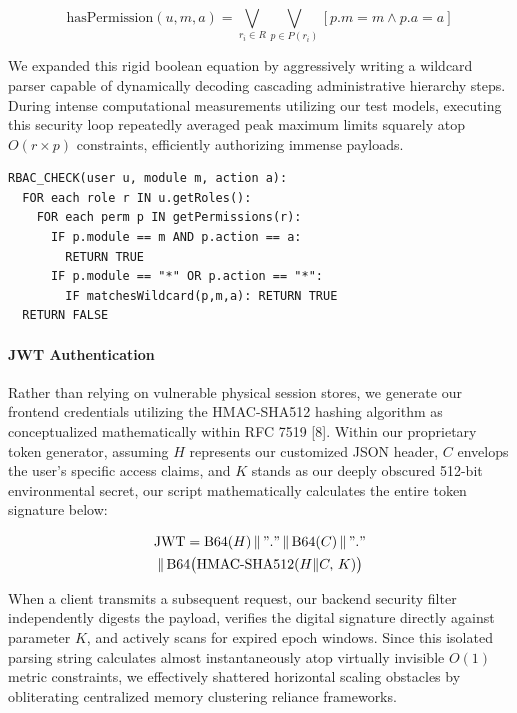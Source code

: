 \begin{equation}
\text{hasPermission}(u, m, a) = \bigvee_{r_i \in R} \bigvee_{p \in P(r_i)} \left[p.m = m \wedge p.a = a\right]
\end{equation}

We expanded this rigid boolean equation by aggressively writing a
wildcard parser capable of dynamically decoding cascading administrative
hierarchy steps. During intense computational measurements utilizing our
test models, executing this security loop repeatedly averaged peak
maximum limits squarely atop \(O(r \times p)\) constraints, efficiently
authorizing immense payloads.

\begin{footnotesize}
\begin{verbatim}
RBAC_CHECK(user u, module m, action a):
  FOR each role r IN u.getRoles():
    FOR each perm p IN getPermissions(r):
      IF p.module == m AND p.action == a:
        RETURN TRUE
      IF p.module == "*" OR p.action == "*":
        IF matchesWildcard(p,m,a): RETURN TRUE
  RETURN FALSE
\end{verbatim}
\end{footnotesize}

\paragraph*{JWT Authentication}\label{jwt-authentication}

Rather than relying on vulnerable physical session stores, we generate
our frontend credentials utilizing the HMAC-SHA512 hashing algorithm as
conceptualized mathematically within RFC 7519 {[}8{]}. Within our
proprietary token generator, assuming \(H\) represents our customized
JSON header, \(C\) envelops the user's specific access claims, and \(K\)
stands as our deeply obscured 512-bit environmental secret, our script
mathematically calculates the entire token signature below:

\begin{multline}
\text{JWT} = \text{B64}(H) \,\|\, "." \,\|\, \text{B64}(C) \,\|\, "." \\
  \|\, \text{B64}\bigl(\text{HMAC-SHA512}(H\|C,\, K)\bigr)
\end{multline}

When a client transmits a subsequent request, our backend security
filter independently digests the payload, verifies the digital signature
directly against parameter \(K\), and actively scans for expired epoch
windows. Since this isolated parsing string calculates almost
instantaneously atop virtually invisible \(O(1)\) metric constraints, we
effectively shattered horizontal scaling obstacles by obliterating
centralized memory clustering reliance frameworks.

